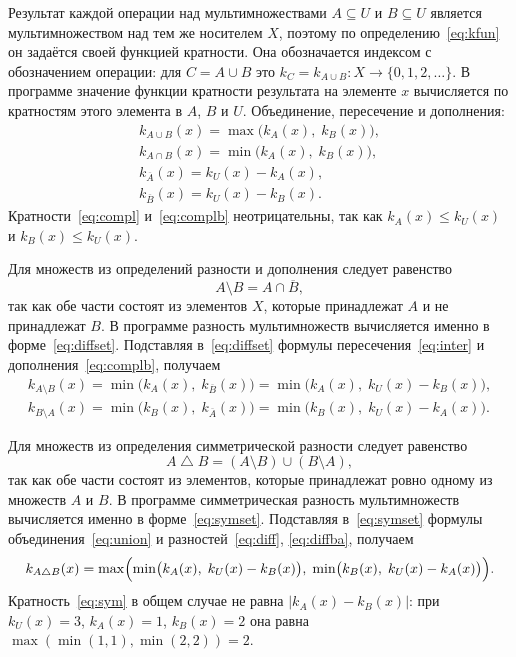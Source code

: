 \documentclass[14pt,a4paper]{extarticle}
\newcommand{\kA}{k_A(x)}
\newcommand{\kB}{k_B(x)}
\newcommand{\kU}{k_U(x)}
\newcommand{\Nset}{\{0, 1, 2, \ldots\}}
\begin{document}
Результат каждой операции над мультимножествами $A \subseteq U$ и $B \subseteq U$ является мультимножеством над тем же носителем $X$, поэтому по определению~\eqref{eq:kfun} он задаётся своей функцией кратности. Она обозначается индексом с обозначением операции: для $C = A \cup B$ это $k_C = k_{A \cup B} \colon X \to \Nset$. В программе значение функции кратности результата на элементе $x$ вычисляется по кратностям этого элемента в $A$, $B$ и $U$. Объединение, пересечение и дополнения:
\begin{gather}
k_{A \cup B}(x) = \max\bigl(\kA,\; \kB\bigr), \label{eq:union}\\
k_{A \cap B}(x) = \min\bigl(\kA,\; \kB\bigr), \label{eq:inter}\\
k_{\overline{A}}(x) = \kU - \kA , \label{eq:compl}\\
k_{\overline{B}}(x) = \kU - \kB . \label{eq:complb}
\end{gather}
Кратности~\eqref{eq:compl} и~\eqref{eq:complb} неотрицательны, так как $\kA \leqslant \kU$ и $\kB \leqslant \kU$.

Для множеств из определений разности и дополнения следует равенство
\begin{equation}\label{eq:diffset}
A \setminus B = A \cap \overline{B},
\end{equation}
так как обе части состоят из элементов $X$, которые принадлежат $A$ и не принадлежат $B$. В программе разность мультимножеств вычисляется именно в форме~\eqref{eq:diffset}. Подставляя в~\eqref{eq:diffset} формулы пересечения~\eqref{eq:inter} и дополнения~\eqref{eq:complb}, получаем
\begin{gather}
k_{A \setminus B}(x) = \min\bigl(\kA,\; k_{\overline{B}}(x)\bigr) = \min\bigl(\kA,\; \kU - \kB\bigr), \label{eq:diff}\\
k_{B \setminus A}(x) = \min\bigl(\kB,\; k_{\overline{A}}(x)\bigr) = \min\bigl(\kB,\; \kU - \kA\bigr). \label{eq:diffba}
\end{gather}

Для множеств из определения симметрической разности следует равенство
\begin{equation}\label{eq:symset}
A \mathbin{\triangle} B = (A \setminus B) \cup (B \setminus A),
\end{equation}
так как обе части состоят из элементов, которые принадлежат ровно одному из множеств $A$ и $B$. В программе симметрическая разность мультимножеств вычисляется именно в форме~\eqref{eq:symset}. Подставляя в~\eqref{eq:symset} формулы объединения~\eqref{eq:union} и разностей~\eqref{eq:diff}, \eqref{eq:diffba}, получаем
\begin{equation}\label{eq:sym}
k_{A \triangle B}(x) = \max\Bigl(\min\bigl(\kA,\; \kU - \kB\bigr),\; \min\bigl(\kB,\; \kU - \kA\bigr)\Bigr).
\end{equation}
Кратность~\eqref{eq:sym} в общем случае не равна $|\kA - \kB|$: при $\kU = 3$, $\kA = 1$, $\kB = 2$ она равна $\max(\min(1, 1), \min(2, 2)) = 2$.
\end{document}
